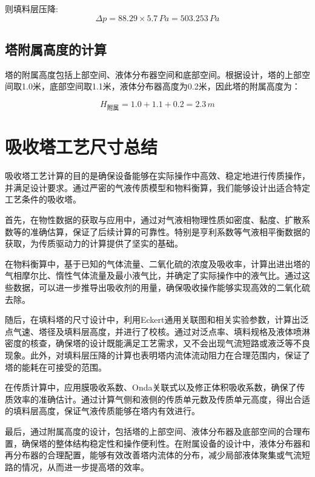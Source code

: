 则填料层压降:
\begin{equation}
	\Delta p=88.29\times5.7 \, Pa = 503.253 \, Pa
\end{equation}

\subsection{塔附属高度的计算}
塔的附属高度包括上部空间、液体分布器空间和底部空间。根据设计，塔的上部空间取1.0米，底部空间取1.1米，液体分布器高度为0.2米，因此塔的附属高度为：

\begin{equation}
	H_{\text{附属}} = 1.0 + 1.1 + 0.2 = 2.3 \, m
\end{equation}



\section{吸收塔工艺尺寸总结}
吸收塔工艺计算的目的是确保设备能够在实际操作中高效、稳定地进行传质操作，并满足设计要求。通过严密的气液传质模型和物料衡算，我们能够设计出适合特定工艺条件的吸收塔。

首先，在物性数据的获取与应用中，通过对气液相物理性质如密度、黏度、扩散系数等的准确估算，保证了后续计算的可靠性。特别是亨利系数等气液相平衡数据的获取，为传质驱动力的计算提供了坚实的基础。

在物料衡算中，基于已知的气体流量、二氧化硫的浓度及吸收率，计算出进出塔的气相摩尔比、惰性气体流量及最小液气比，并确定了实际操作中的液气比。通过这些数据，可以进一步推导出吸收剂的用量，确保吸收操作能够实现高效的二氧化硫去除。

随后，在填料塔的尺寸设计中，利用Eckert通用关联图和相关实验参数，计算出泛点气速、塔径及填料层高度，并进行了校核。通过对泛点率、填料规格及液体喷淋密度的核查，确保塔的设计既能满足工艺需求，又不会出现气流短路或液泛等不良现象。此外，对填料层压降的计算也表明塔内流体流动阻力在合理范围内，保证了塔的能耗在可接受的范围。

在传质计算中，应用膜吸收系数、Onda关联式以及修正体积吸收系数，确保了传质效率的准确估计。通过计算气侧和液侧的传质单元数及传质单元高度，得出合适的填料层高度，保证气液传质能够在塔内有效进行。

最后，通过附属高度的设计，包括塔的上部空间、液体分布器及底部空间的合理布置，确保塔的整体结构稳定性和操作便利性。在附属设备的设计中，液体分布器和再分布器的合理配置，能够有效改善塔内流体的分布，减少局部液体聚集或气流短路的情况，从而进一步提高塔的效率。

